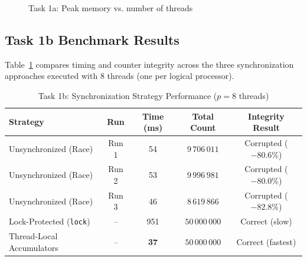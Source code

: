 \documentclass[11pt,a4paper]{article}
\begin{document}
\begin{figure}[H]
\centering
{}
\caption{Task 1a: Peak memory vs. number of threads}
\label{fig:task1a_mem}
\end{figure}

\subsection{Task 1b Benchmark Results}
Table~\ref{tab:task1b} compares timing and counter integrity across the three synchronization approaches executed with 8 threads (one per logical processor).

\begin{table}[H]
\centering
\caption{Task 1b: Synchronization Strategy Performance ($p = 8$ threads)}
\label{tab:task1b}
\vspace{2mm}
\small
\setlength{\tabcolsep}{4pt}
\begin{tabular}{lcccc}
\toprule
\textbf{Strategy} & \textbf{Run} & \textbf{Time (ms)} & \textbf{Total Count} & \textbf{Integrity Result} \\
\midrule
Unsynchronized (Race) & Run 1 & 54 & $9\,706\,011$ & Corrupted ($-80.6\%$) \\
Unsynchronized (Race) & Run 2 & 53 & $9\,996\,981$ & Corrupted ($-80.0\%$) \\
Unsynchronized (Race) & Run 3 & 46 & $8\,619\,866$ & Corrupted ($-82.8\%$) \\
Lock-Protected (\texttt{lock}) & -- & 951 & $50\,000\,000$ & Correct (slow) \\
Thread-Local Accumulators & -- & \textbf{37} & $50\,000\,000$ & Correct (fastest) \\
\bottomrule
\end{tabular}
\end{table}
\end{document}
